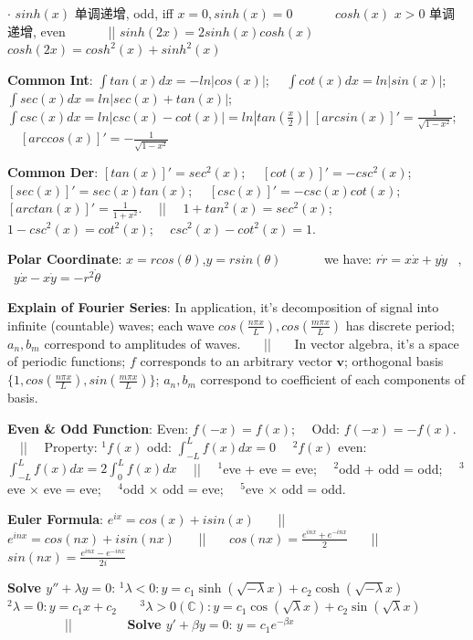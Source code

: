 \documentclass[8pt]{extarticle}
\begin{document}
$\cdot$ $sinh(x)$ 单调递增, odd, iff $x=0,sinh(x)=0$ \ \ \ \ \ \ $cosh(x)$ $x>0$ 单调递增, even \ \ \ \ \ \ || $sinh(2x)=2sinh(x)cosh(x)$ \ \ \ \ \ \ $cosh(2x)=cosh^2(x)+sinh^2(x)$

\textbf{Common Int}: $\int tan(x)dx=-ln|cos(x)|$; \ \ $\int cot(x)dx=ln|sin(x)|$; \ \ $\int sec(x)dx = ln|sec(x)+tan(x)|$; \ \ $\int csc(x)dx = ln|csc(x)-cot(x)| = ln|tan(\frac{x}{2})|$ \hspace{60pt} $[arcsin(x)]'=\frac{1}{\sqrt{1-x^2}}$; \ \ $[arccos(x)]'=-\frac{1}{\sqrt{1-x^2}}$

\textbf{Common Der}: $[tan(x)]'=sec^2(x)$; \ \ $[cot(x)]'=-csc^2(x)$; \ \ $[sec(x)]'=sec(x)tan(x)$; \ \ $[csc(x)]'=-csc(x)cot(x)$; \ \ $[arctan(x)]'=\frac{1}{1+x^2}$. \ \ || \ \ $1+tan^2(x)=sec^2(x)$; \ \ $1-csc^2(x)=cot^2(x)$; \ \ $csc^2(x)-cot^2(x)=1$.

\textbf{Polar Coordinate}: $x=rcos(\theta)$,$y=rsin(\theta)$ \ \ \ \ \ \ we have: $r\dot{r}=x\dot{x}+y\dot{y}$ \ , \ $y\dot{x}-x\dot{y}=-r^2\dot{\theta}$

\textbf{Explain of Fourier Series}: {\scriptsize In application, it's decomposition of signal into infinite (countable) waves; each wave $cos(\frac{n\pi x}{L}),cos(\frac{m\pi x}{L})$ has discrete period; $a_n,b_m$ correspond to amplitudes of waves.} \ \ \ || \ \ \ {\scriptsize In vector algebra, it's a space of periodic functions; $f$ corresponds to an arbitrary vector $\mathbf{v}$; orthogonal basis $\{1, cos(\frac{n\pi x}{L}), sin(\frac{m\pi x}{L})\}$; $a_n,b_m$ correspond to coefficient of each components of basis.}

\textbf{Even \& Odd Function}: Even: $f(-x)=f(x)$; \ \ Odd: $f(-x)=-f(x)$. \ \ || \ \ Property: $^1f(x)$ odd: $\int_{-L}^{L}f(x)dx=0$ \ \ $^2f(x)$ even: $\int_{-L}^{L}f(x)dx=2\int_{0}^{L}f(x)dx$ \ \ || \ \ $^1$eve + eve = eve; \ \ $^2$odd + odd = odd; \ \ $^3$eve $\times$ eve = eve; \ \ $^4$odd $\times$ odd = eve; \ \ $^5$eve $\times$ odd = odd.

\textbf{Euler Formula}: { $e^{ix}=cos(x)+isin(x)$ \ \ \ || \ \ \ $e^{inx}=cos(nx)+isin(nx)$ \ \ \ || \ \ \ $cos(nx)=\frac{e^{inx}+e^{-inx}}{2}$ \ \ \ || \ \ \ $sin(nx)=\frac{e^{inx}-e^{-inx}}{2i}$}

\textbf{Solve $y''+\lambda y=0$}: { $^1\lambda<0:y=c_1\sinh(\sqrt{-\lambda}x)+c_2\cosh(\sqrt{-\lambda}x)$ \ \ \ $^2\lambda=0:y=c_1x+c_2$ \ \ \ $^3\lambda>0(\mathbb{C}):y=c_1\cos(\sqrt{\lambda}x)+c_2\sin(\sqrt{\lambda}x)$} \ \ \ \ \ \ \ \ \ || \ \ \ \ \ \ \ \ \textbf{Solve $y'+\beta y=0$}: { $y=c_1e^{-\beta x}$}
\end{document}
